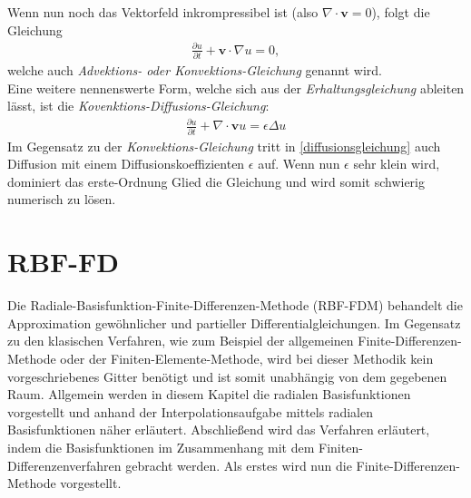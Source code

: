 \documentclass[12pt,titlepage]{article}
\begin{document}
Wenn nun noch das Vektorfeld inkrompressibel ist (also $\nabla \cdot \textbf{v}=0$), folgt die Gleichung
\begin{align}
 \frac{\partial u}{\partial t}+\textbf{v}\cdot\nabla u=0,
\end{align}
welche auch \textit{Advektions- oder Konvektions-Gleichung} genannt wird.\\
Eine weitere nennenswerte Form, welche sich aus der \textit{Erhaltungsgleichung} ableiten lässt, ist die \textit{Kovenktions-Diffusions-Gleichung}:
\begin{align}
 \frac{\partial u}{\partial t}+\nabla \cdot \textbf{v}u = \epsilon\Delta u\label{diffusionsgleichung}
\end{align}
Im Gegensatz zu der \textit{Konvektions-Gleichung} tritt in \eqref{diffusionsgleichung} auch Diffusion mit einem Diffusionskoeffizienten $\epsilon$ auf. Wenn nun $\epsilon$ sehr klein wird, dominiert das erste-Ordnung Glied die Gleichung und wird somit schwierig numerisch zu lösen.\cite{segal2013numerik}
\pagebreak
\section{RBF-FD}\label{sec:RBF-FD}
Die Radiale-Basisfunktion-Finite-Differenzen-Methode (RBF-FDM) behandelt die Approximation gewöhnlicher und partieller Differentialgleichungen. Im Gegensatz zu den klasischen Verfahren, wie zum Beispiel der allgemeinen Finite-Differenzen-Methode oder der Finiten-Elemente-Methode, wird bei dieser Methodik kein vorgeschriebenes Gitter benötigt und ist somit unabhängig von dem gegebenen Raum. Allgemein werden in diesem Kapitel die radialen Basisfunktionen vorgestellt und anhand der Interpolationsaufgabe mittels radialen Basisfunktionen näher erläutert. Abschließend wird das Verfahren erläutert, indem die Basisfunktionen im Zusammenhang mit dem Finiten-Differenzenverfahren gebracht werden. Als erstes wird nun die Finite-Differenzen-Methode vorgestellt.
\end{document}

